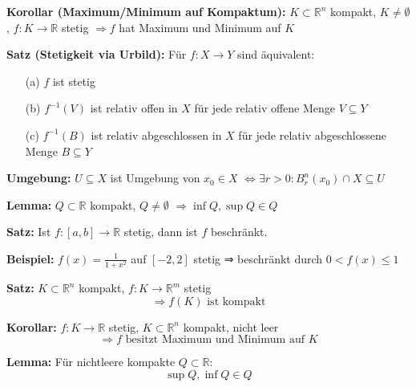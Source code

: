 \begin{itemize}
\textbf{Korollar (Maximum/Minimum auf Kompaktum):}  
\(K \subset \mathbb{R}^n\) kompakt, \(K \ne \emptyset\), \(f: K \to \mathbb{R}\) stetig  
\(\Rightarrow f\) hat Maximum und Minimum auf \(K\)

\textbf{Satz (Stetigkeit via Urbild):}  
Für \(f: X \to Y\) sind äquivalent:
\begin{itemize}
  \item[(a)] \(f\) ist stetig
  \item[(b)] \(f^{-1}(V)\) ist relativ offen in \(X\) für jede relativ offene Menge \(V \subseteq Y\)
  \item[(c)] \(f^{-1}(B)\) ist relativ abgeschlossen in \(X\) für jede relativ abgeschlossene Menge \(B \subseteq Y\)
\end{itemize}

\textbf{Umgebung:}  
\(U \subseteq X\) ist Umgebung von \(x_0 \in X\)  
\(\Leftrightarrow \exists r > 0: B_r^n(x_0) \cap X \subseteq U\)

\textbf{Lemma:}  
\(Q \subset \mathbb{R}\) kompakt, \(Q \ne \emptyset\)  
\(\Rightarrow \inf Q, \sup Q \in Q\)

\textbf{Satz:}  
Ist \( f: [a,b] \to \mathbb{R} \) stetig, dann ist \( f \) beschränkt.

\textbf{Beispiel:}  
\( f(x) = \frac{1}{1 + x^2} \) auf \( [-2, 2] \) stetig ⇒ beschränkt durch \( 0 < f(x) \leq 1 \)

\textbf{Satz:}  
\( K \subset \mathbb{R}^n \) kompakt,\; \( f: K \to \mathbb{R}^m \) stetig  
\[
\Rightarrow f(K) \text{ ist kompakt}
\]


\textbf{Korollar:}  
\( f: K \to \mathbb{R} \) stetig, \( K \subset \mathbb{R}^n \) kompakt, nicht leer  
\[
\Rightarrow f \text{ besitzt Maximum und Minimum auf } K
\]


\textbf{Lemma:}  
Für nichtleere kompakte \( Q \subset \mathbb{R} \):  
\[
\sup Q, \inf Q \in Q
\]


\end{itemize}
